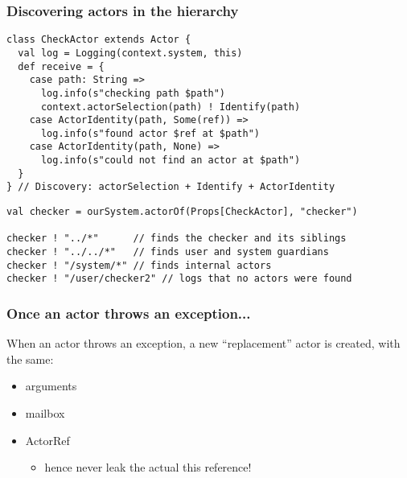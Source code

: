 \documentclass[aspectratio=169]{beamer}
\begin{document}
\begin{frame}[fragile]\frametitle{Discovering actors in the hierarchy}

\begin{lstlisting}[emph={Actor, Logging, Props, ourSystem,terminate,sleep,actorOf,receive,Identify,actorSelection,ActorIdentity}]
class CheckActor extends Actor {
  val log = Logging(context.system, this)
  def receive = {
    case path: String =>
      log.info(s"checking path $path")
      context.actorSelection(path) ! Identify(path)
    case ActorIdentity(path, Some(ref)) =>
      log.info(s"found actor $ref at $path")
    case ActorIdentity(path, None) =>
      log.info(s"could not find an actor at $path")
  }
} // Discovery: actorSelection + Identify + ActorIdentity
\end{lstlisting}    

\pause
\begin{lstlisting}[emph={Actor, Logging, Props, ourSystem,terminate,sleep,actorOf,receive,Identify,actorSelection,ActorIdentity}]
val checker = ourSystem.actorOf(Props[CheckActor], "checker")

checker ! "../*"      // finds the checker and its siblings
checker ! "../../*"   // finds user and system guardians
checker ! "/system/*" // finds internal actors
checker ! "/user/checker2" // logs that no actors were found
\end{lstlisting}
\end{frame}


\begin{frame}\frametitle{Once an actor throws an exception...}
  When an actor throws an exception, a new \alert{``replacement'' actor} is created,
  with the same:
  \begin{itemize}
    \item arguments
    \item mailbox
    \item ActorRef
    \pause
      \begin{itemize}
        \item hence never leak the actual \alert{this} reference!
      \end{itemize}
  \end{itemize}
\end{frame}
\end{document}
